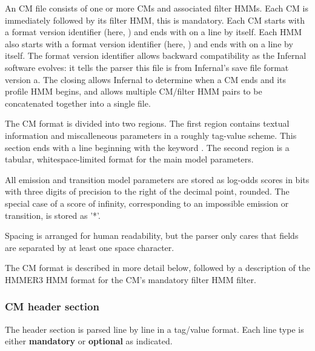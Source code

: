 An CM file consists of one or more CMs and associated filter
HMMs. Each CM is immediately followed by its filter HMM, this is
mandatory. Each CM starts with a format version identifier (here,
) and ends with \prog{//} on a line by itself. Each
HMM also starts with a format version identifier (here,
) and ends with \prog{//} on a line by itself.  The
format version identifier allows backward compatibility as the
Infernal software evolves: it tells the parser this file is from
Infernal's save file format version a.  The closing \prog{//} allows
Infernal to determine when a CM ends and its profile HMM begins, and
allows multiple CM/filter HMM pairs to be concatenated together into a
single file.

The CM format is divided into two regions. The first region contains
textual information and miscalleneous parameters in a roughly
tag-value scheme.  This section ends with a line beginning with the
keyword . The second region is a tabular, whitespace-limited
format for the main model parameters.

All emission and transition model parameters are stored as log-odds
scores in bits with three digits of precision to the right of the
decimal point, rounded. 
The special case of a score of infinity, corresponding to an
impossible emission or transition, is stored as '*'.

Spacing is arranged for human readability, but the parser only cares
that fields are separated by at least one space character.

The CM format is described in more detail below, followed by a
description of the HMMER3 HMM format for the CM's mandatory filter HMM
filter.

\subsubsection{CM header section}

The header section is parsed line by line in a tag/value format. Each
line type is either \textbf{mandatory} or \textbf{optional} as
indicated. 

